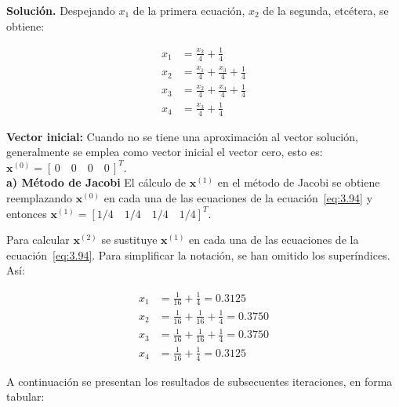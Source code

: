 \documentclass[12pt,letterpaper]{article}
\theoremstyle{definition}
\theoremstyle{plain}
\theoremstyle{remark}
\begin{document}
\textbf{Solución.} Despejando $x_1$ de la primera ecuación, $x_2$ de la segunda, etcétera, se obtiene:

\begin{equation}
\begin{aligned}
x_1 &= \frac{x_2}{4} + \frac{1}{4} \\
x_2 &= \frac{x_1}{4} + \frac{x_3}{4} + \frac{1}{4} \\
x_3 &= \frac{x_2}{4} + \frac{x_4}{4} + \frac{1}{4} \\
x_4 &= \frac{x_3}{4} + \frac{1}{4}
\end{aligned}
\label{eq:3.94}
\tag{14}
\end{equation}

\textbf{Vector inicial:} Cuando no se tiene una aproximación al vector solución, generalmente se emplea como vector inicial el vector cero, esto es: \(\mathbf{x}^{(0)} = [\,0 \quad 0 \quad 0 \quad 0\,]^T\).\\

\textbf{a) Método de Jacobi} El cálculo de $\mathbf{x}^{(1)}$ en el método de Jacobi se obtiene reemplazando $\mathbf{x}^{(0)}$ en cada una de las ecuaciones de la ecuación~\eqref{eq:3.94} y entonces $\mathbf{x}^{(1)} = [1/4 \quad 1/4 \quad 1/4 \quad 1/4]^T$.

Para calcular $\mathbf{x}^{(2)}$ se sustituye $\mathbf{x}^{(1)}$ en cada una de las ecuaciones de la ecuación~\eqref{eq:3.94}. Para simplificar la notación, se han omitido los superíndices. Así:

\[
\begin{aligned}
x_1 &= \frac{1}{16} + \frac{1}{4} = 0.3125 \\
x_2 &= \frac{1}{16} + \frac{1}{16} + \frac{1}{4} = 0.3750 \\
x_3 &= \frac{1}{16} + \frac{1}{16} + \frac{1}{4} = 0.3750 \\
x_4 &= \frac{1}{16} + \frac{1}{4} = 0.3125
\end{aligned}
\]

A continuación se presentan los resultados de subsecuentes iteraciones, en forma tabular:
\end{document}
